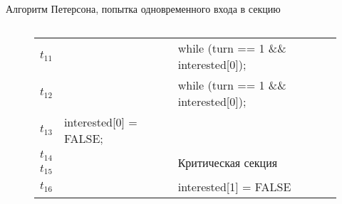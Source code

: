 \documentclass[aspectratio=169,14pt]{beamer}
\begin{document}
\begin{frame}[containsverbatim]{Алгоритм Петерсона, попытка одновременного входа в секцию}
\begin{columns}
\begin{column}{0.68\textwidth}
\begin{figure}[htp]
\begin{tiny}
\begin{tabular}{p{0.5cm}|p{2.4cm}|p{2.4cm}}
                        $t_{11}$ & & while (turn == 1 \&\& interested[0]); \\ \cline{1-1}\cline{3-3}
                        $t_{12}$ & & while (turn == 1 \&\& interested[0]); \\ \hline
                        $t_{13}$ & interested[0] = FALSE; & \\ \hline
                        $t_{14}$ & & \multirow{2}{=}{Критическая секция} \\ \cline{1-2}
                        $t_{15}$ & & \\ \hline
                        $t_{16}$ & & interested[1] = FALSE \\ \hline
                    \end{tabular}
                \end{tiny}
            \end{figure}
        \end{column}
    \end{columns}
\end{frame}
\end{document}
